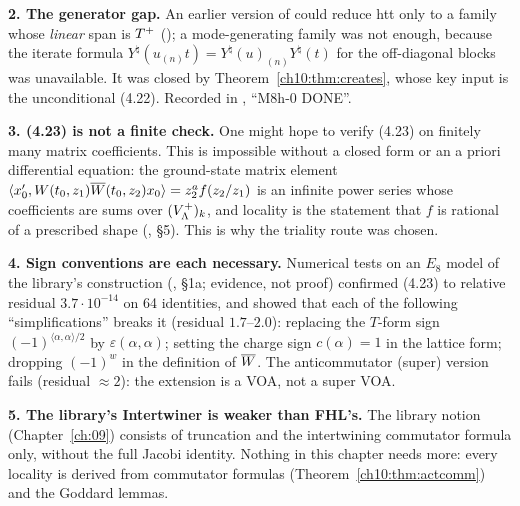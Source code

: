 \begin{warning}
\textbf{2. The generator gap.}
An earlier version of  could reduce htt only to a family whose
\emph{linear} span is $T^{+}$ (); a mode-generating family was not enough,
because the iterate formula $Y^\natural(u_{(n)}t)=Y^\natural(u)_{(n)}Y^\natural(t)$ for the
off-diagonal blocks was unavailable.  It was closed by Theorem~\ref{ch10:thm:creates}, whose key
input is the unconditional (4.22).  Recorded in , ``M8h-0 DONE''.
\end{warning}

\begin{warning}
\textbf{3. (4.23) is not a finite check.}
One might hope to verify (4.23) on finitely many matrix coefficients.  This is impossible without
a closed form or an a priori differential equation: the ground-state matrix element
$\langle x_0',W(t_0,z_1)\overline{W}(t_0,z_2)x_0\rangle=z_2^af(z_2/z_1)$ is an infinite power series whose
coefficients are sums over $(V_{\Lambda}^{+})_k$, and locality is the statement that $f$ is rational of a
prescribed shape (, §5).  This is why the triality route was chosen.
\end{warning}

\begin{warning}
\textbf{4. Sign conventions are each necessary.}
Numerical tests on an $E_8$ model of the library's construction (,
§1a; evidence, not proof) confirmed (4.23) to relative residual $3.7\cdot10^{-14}$ on 64
identities, and showed that each of the following ``simplifications'' breaks it (residual
$1.7$--$2.0$): replacing the $T$-form sign $(-1)^{\langle\alpha,\alpha\rangle/2}$ by
$\varepsilon(\alpha,\alpha)$; setting the charge sign $c(\alpha)=1$ in the lattice form; dropping
$(-1)^w$ in the definition of $\overline{W}$.  The anticommutator (super) version fails (residual
$\approx2$): the extension is a VOA, not a super VOA.
\end{warning}

\begin{warning}
\textbf{5. The library's Intertwiner is weaker than FHL's.}
The library notion  (Chapter~\ref{ch:09}) consists of truncation and the
intertwining commutator formula only, without the full Jacobi identity.  Nothing in this chapter
needs more: every locality is derived from commutator formulas (Theorem~\ref{ch10:thm:actcomm})
and the Goddard lemmas.
\end{warning}


